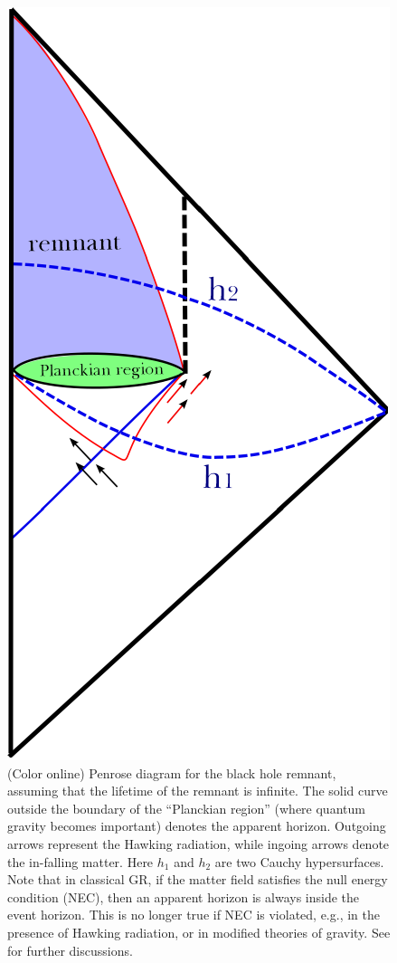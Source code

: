 \documentclass[12pt]{article}
\newcommand{\2}{$^2$}
\newcommand{\3}{$^3$}
\newcommand{\4}{$_4$}
\newcommand{\5}{$_5$}
\begin{document}
\begin{figure}
\begin{center}
\includegraphics[scale=1.00]{remnant-eps-converted-to.pdf}
\caption{\label{fig:remnant} (Color online) Penrose diagram for the black hole remnant, assuming that the lifetime of the remnant is infinite. The solid curve outside the boundary of the ``Planckian region'' (where quantum gravity becomes important) denotes the apparent horizon. Outgoing arrows represent the Hawking radiation, while ingoing arrows denote the in-falling matter. Here $h_1$ and $h_2$ are two Cauchy hypersurfaces. Note that in classical GR, if the matter field satisfies the null energy condition (NEC), then an apparent horizon is always inside the event horizon. This is no longer true if NEC is violated, e.g., in the presence of Hawking radiation, or in modified theories of gravity. See \cite{1309.4915} for further discussions.}
\end{center}
\end{figure}
\end{document}
